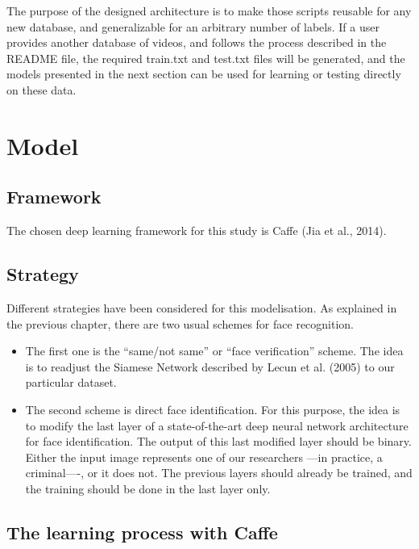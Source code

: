 The purpose of the designed architecture is to make those scripts reusable for any new database, and generalizable for an arbitrary number of labels. If a user provides another database of videos, and follows the process described in the README file, the required train.txt and test.txt files will be generated, and the models presented in the next section can be used for learning or testing directly on these data.

\section{Model}

\subsection{Framework}
The chosen deep learning framework for this study is Caffe (Jia et al., 2014).\\

\subsection{Strategy}
Different strategies have been considered for this modelisation. As explained in the previous chapter, there are two usual schemes for face recognition.
\begin{itemize}
\item The first one is the \enquote{same/not same} or \enquote{face verification} scheme. The idea is to readjust the Siamese Network described by Lecun et al. (2005) to our particular dataset.\newline
\item The second scheme is direct face identification. For this purpose, the idea is to modify the last layer of a state-of-the-art deep neural network architecture for face identification. The output of this last modified layer should be binary. Either the input image represents one of our researchers ---in practice, a criminal----, or it does not. The previous layers should already be trained, and the training should be done in the last layer only.
\end{itemize}
\subsection{The learning process with Caffe}

